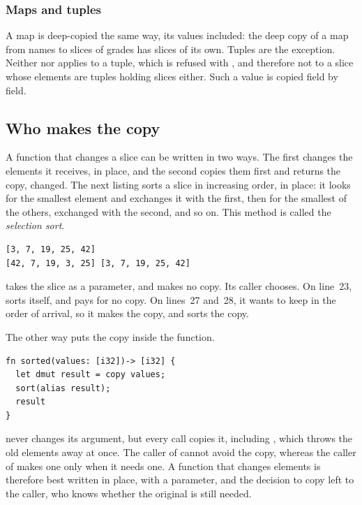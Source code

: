 \subsubsection*{Maps and tuples}

A map is deep-copied the same way, its values included: the deep copy of a map
from names to slices of grades has slices of its own. Tuples are the exception.
Neither  nor  applies to a tuple, which is refused with
, and therefore not to a
slice whose elements are tuples holding slices either. Such a value is copied
field by field.

\subsection{Who makes the copy}

A function that changes a slice can be written in two ways. The first changes
the elements it receives, in place, and the second copies them first and
returns the copy, changed. The next listing sorts a slice in increasing order,
in place: it looks for the smallest element and exchanges it with the first,
then for the smallest of the others, exchanged with the second, and so on. This
method is called the \textit{selection sort}.


\vspace{-10pt}%
\begin{lstlisting}[style=bashVerb]
[3, 7, 19, 25, 42]
[42, 7, 19, 3, 25] [3, 7, 19, 25, 42]
\end{lstlisting}

 takes the slice as a  parameter, and makes no copy.
Its caller chooses. On line~23,  sorts  itself, and
pays for no copy. On lines~27 and~28, it wants to keep  in the
order of arrival, so it makes the copy, and sorts the copy.

The other way puts the copy inside the function.

\begin{lstlisting}[style=coloredverbatim]
fn sorted(values: [i32])-> [i32] {
  let dmut result = copy values;
  sort(alias result);
  result
}
\end{lstlisting}

 never changes its argument, but every call copies it, including
, which throws the old elements away at once.
The caller of  cannot avoid the copy, whereas the caller of
 makes one only when it needs one. A function that changes
elements is therefore best written in place, with a  parameter, and
the decision to copy left to the caller, who knows whether the original is
still needed.

